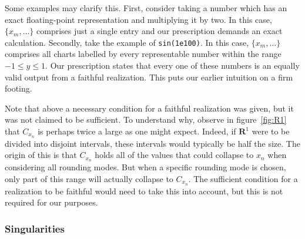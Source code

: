 \documentclass[prd,twocolumn,amsmath,amssymb,nofootinbib,eqsecnum]{revtex4-1}
\newcommand{\code}[1]{{\tt #1}}
\newcommand{\fig}[1]{figure~\ref{fig:#1}}
\begin{document}
Some examples may clarify this. First, consider taking a number which has an exact floating-point representation and multiplying it by two.
In this case, $\{x_{m}, \ldots\}$ comprises just a single entry and our prescription demands an exact calculation. Secondly, take the example of \code{sin(1e100)}. In this case, $\{x_{m}, \ldots\}$ comprises all charts labelled by every representable number within the range $-1 \leq y \leq 1$. Our prescription states that every one of these numbers is an equally valid output from a faithful realization. This puts our earlier intuition on a firm footing.

Note that above a necessary condition for a faithful realization was given, but it was not claimed to
be sufficient. To understand why, observe in \fig{R1} that $C_{x_n}$ is perhaps twice a large as one
might expect. Indeed, if $\mathbf{R}^1$ were to be divided into disjoint intervals, these intervals would typically be half the size. The origin of this is that $C_{x_n}$ holds all of the values that could collapse to $x_n$ when considering all rounding modes. But when a specific rounding mode is chosen, only part of this range will actually collapse to $C_{x_n}$. The sufficient condition for a realization to be faithful
would need to take this into account, but this is not required for our purposes.

\subsubsection{Singularities}
\end{document}
